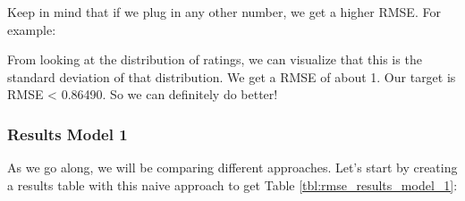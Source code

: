 \documentclass[
]{article}
\newenvironment{Shaded}{}{}
\newcommand{\DecValTok}[1]{\textcolor[rgb]{0.25,0.63,0.44}{#1}}
\newcommand{\FloatTok}[1]{\textcolor[rgb]{0.25,0.63,0.44}{#1}}
\newcommand{\FunctionTok}[1]{\textcolor[rgb]{0.02,0.16,0.49}{#1}}
\newcommand{\NormalTok}[1]{#1}
\newcommand{\OtherTok}[1]{\textcolor[rgb]{0.00,0.44,0.13}{#1}}
\newcommand{\SpecialCharTok}[1]{\textcolor[rgb]{0.25,0.44,0.63}{#1}}
\begin{document}
\begin{Shaded}
\end{Shaded}

Keep in mind that if we plug in any other number, we get a higher RMSE.
For example:

\begin{Shaded}
\end{Shaded}

From looking at the distribution of ratings, we can visualize that this
is the standard deviation of that distribution. We get a RMSE of about
1. Our target is RMSE \textless{} 0.86490. So we can definitely do
better!

\newpage

\hypertarget{results-model-1}{%
\subsubsection{Results Model 1}\label{results-model-1}}

As we go along, we will be comparing different approaches. Let's start
by creating a results table with this naive approach to get Table
\ref{tbl:rmse_results_model_1}:
\end{document}
